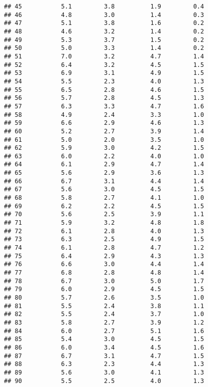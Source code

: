 \documentclass[]{article}
\begin{document}
\begin{verbatim}
## 45           5.1         3.8          1.9         0.4
## 46           4.8         3.0          1.4         0.3
## 47           5.1         3.8          1.6         0.2
## 48           4.6         3.2          1.4         0.2
## 49           5.3         3.7          1.5         0.2
## 50           5.0         3.3          1.4         0.2
## 51           7.0         3.2          4.7         1.4
## 52           6.4         3.2          4.5         1.5
## 53           6.9         3.1          4.9         1.5
## 54           5.5         2.3          4.0         1.3
## 55           6.5         2.8          4.6         1.5
## 56           5.7         2.8          4.5         1.3
## 57           6.3         3.3          4.7         1.6
## 58           4.9         2.4          3.3         1.0
## 59           6.6         2.9          4.6         1.3
## 60           5.2         2.7          3.9         1.4
## 61           5.0         2.0          3.5         1.0
## 62           5.9         3.0          4.2         1.5
## 63           6.0         2.2          4.0         1.0
## 64           6.1         2.9          4.7         1.4
## 65           5.6         2.9          3.6         1.3
## 66           6.7         3.1          4.4         1.4
## 67           5.6         3.0          4.5         1.5
## 68           5.8         2.7          4.1         1.0
## 69           6.2         2.2          4.5         1.5
## 70           5.6         2.5          3.9         1.1
## 71           5.9         3.2          4.8         1.8
## 72           6.1         2.8          4.0         1.3
## 73           6.3         2.5          4.9         1.5
## 74           6.1         2.8          4.7         1.2
## 75           6.4         2.9          4.3         1.3
## 76           6.6         3.0          4.4         1.4
## 77           6.8         2.8          4.8         1.4
## 78           6.7         3.0          5.0         1.7
## 79           6.0         2.9          4.5         1.5
## 80           5.7         2.6          3.5         1.0
## 81           5.5         2.4          3.8         1.1
## 82           5.5         2.4          3.7         1.0
## 83           5.8         2.7          3.9         1.2
## 84           6.0         2.7          5.1         1.6
## 85           5.4         3.0          4.5         1.5
## 86           6.0         3.4          4.5         1.6
## 87           6.7         3.1          4.7         1.5
## 88           6.3         2.3          4.4         1.3
## 89           5.6         3.0          4.1         1.3
## 90           5.5         2.5          4.0         1.3

\end{verbatim}
\end{document}
